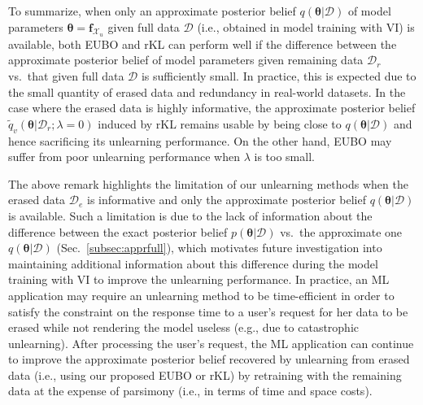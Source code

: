 \documentclass{article}
\theoremstyle{definition}
\newcommand{\mbf}[1]{\mathbf{#1}}
\newcommand{\mcl}[1]{\mathcal{#1}}
\newcommand{\da}{\mcl{D}}
\newcommand{\dc}{\mcl{D}_r}
\newcommand{\dr}{\mcl{D}_e}
\newcommand{\elbo}{\tilde{q}_v}
\begin{document}
%
To summarize, when only an approximate posterior belief $q(\bm{\theta}|\da)$ of model parameters $\bm{\theta}=\mbf{f}_{\mcl{X}_u}$ given full data $\da$ (i.e., obtained in model training with VI) is available, both EUBO and rKL can perform well if the difference between the approximate posterior belief of model parameters given remaining data $\dc$ vs.~that given full data $\da$ is sufficiently small. 
In practice, this is expected
due to the small quantity of erased data and redundancy in real-world datasets. In the case where the erased data is highly informative, the approximate posterior belief $\elbo(\bm{\theta}|\dc; \lambda=0)$ induced by rKL remains usable by being close to $q(\bm{\theta}|\da)$ and hence sacrificing its unlearning performance.
On the other hand, EUBO may suffer from poor unlearning performance when $\lambda$ is too small.

The above remark highlights the limitation of our unlearning methods when the erased data $\dr$ is informative and only the approximate posterior belief $q(\bm{\theta}|\da)$ is available.
Such a limitation is due to the lack of  information about the difference between the exact posterior belief $p(\bm{\theta}|\da)$ vs.~the approximate one $q(\bm{\theta}|\da)$ (Sec.~\ref{subsec:apprfull}), which 
motivates future investigation into maintaining additional information about this difference during the model training with VI to improve the unlearning performance.
In practice, an ML application may require an unlearning method to be time-efficient in order to satisfy the constraint on the response time to a user's request for her data to be erased while not rendering the model useless (e.g., due to catastrophic unlearning). 
After processing the user's request, the ML application can continue to improve the
approximate posterior belief recovered by unlearning from erased data (i.e., using our proposed EUBO or rKL) by retraining with the remaining data at the expense of parsimony (i.e., in terms of time and space costs).
\end{document}
